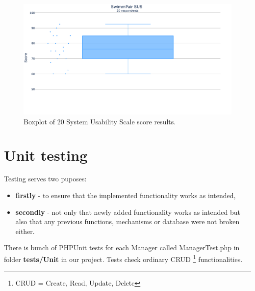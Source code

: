 \begin{figure}[h]	
    \centering	
    \includegraphics[scale=0.257]{img/sus_general.png}
    \caption{Boxplot of 20 System Usability Scale score results.}
    \label{fig4.1:susgeneral}
\end{figure}

\newpage
\section{Unit testing}
Testing serves two puposes:
\begin{itemize}
    \item \textbf{firstly} - to ensure that the implemented functionality works as intended,
    \item \textbf{secondly} - not only that newly added functionality works as intended but also that any previous functions, mechanisms or database were not broken either. 
\end{itemize}
There is bunch of PHPUnit tests for each Manager called ManagerTest.php in folder \textbf{tests/Unit} in our project. Tests check ordinary CRUD \footnote{CRUD = Create, Read, Update, Delete} functionalities.
